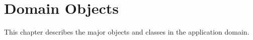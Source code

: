 
\chapter{Domain Objects}
\label{cha:pdomain}

This chapter describes the major objects and classes in the
application domain.





